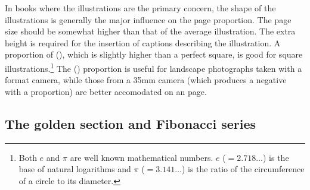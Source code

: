 \documentclass[10pt,a4paper,extrafontsizes]{memoir}
\begin{document}
\begin{paracol}{2}
\switchEng
    In books where the illustrations are the primary 
concern, the shape of the illustrations is generally 
the major influence on the page proportion.
The page size should be somewhat higher than that of the average 
illustration. The extra height is required for the 
insertion of captions describing the
illustration. 
A proportion of  (), 
which is slightly higher
than a perfect square, is good for square illustrations.\footnote{Both $e$
and $\pi$ are well known mathematical numbers. $e$ ($= 2.718 \ldots$)
is the base of natural logarithms and $\pi$ ($= 3.141 \ldots$) is the
ratio of the circumference of a circle to its diameter.}
The 
() proportion is useful for landscape 
photographs  taken with a 
format camera, while those from a 35mm camera (which produces a negative
with a  proportion) are better accomodated on 
an  page.
\end{paracol}

\subsection{The golden section and Fibonacci series}
\end{document}
